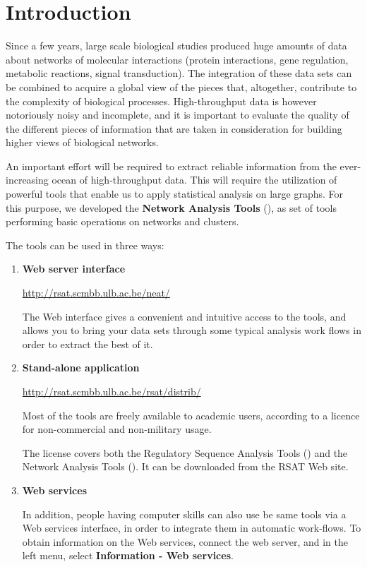 \chapter{Introduction}

Since a few years, large scale biological studies produced huge
amounts of data about networks of molecular interactions (protein
interactions, gene regulation, metabolic reactions, signal
transduction). The integration of these data sets can be combined to
acquire a global view of the pieces that, altogether, contribute to
the complexity of biological processes. High-throughput data is
however notoriously noisy and incomplete, and it is important to
evaluate the quality of the different pieces of information that are
taken in consideration for building higher views of biological
networks.

An important effort will be required to extract reliable information
from the ever-increasing ocean of high-throughput data. This will
require the utilization of powerful tools that enable us to apply
statistical analysis on large graphs. For this purpose, we developed
the \textbf{Network Analysis Tools} (\neat), as set of tools performing
basic operations on networks and clusters. 

The tools can be used in three ways:

\begin{enumerate}

\item \textbf{Web server interface}

  \url{http://rsat.scmbb.ulb.ac.be/neat/}
  
  The Web interface gives a convenient and intuitive access to the
  tools, and allows you to bring your data sets through some typical
  analysis work flows in order to extract the best of it.
  
\item \textbf{Stand-alone application}
  
  \url{http://rsat.scmbb.ulb.ac.be/rsat/distrib/}
  
  Most of the tools are freely available to academic users, according
  to a licence for non-commercial and non-military usage.

  The license covers both the Regulatory Sequence Analysis Tools
  (\RSAT) and the Network Analysis Tools (\neat). It can be downloaded
  from the RSAT Web site.

\item \textbf{Web services}

  
  In addition, people having computer skills can also use be same
  tools via a Web services interface, in order to integrate them in
  automatic work-flows. To obtain information on the Web services,
  connect the \neat web server, and in the left menu, select
  \textbf{Information - Web services}.

\end{enumerate}

